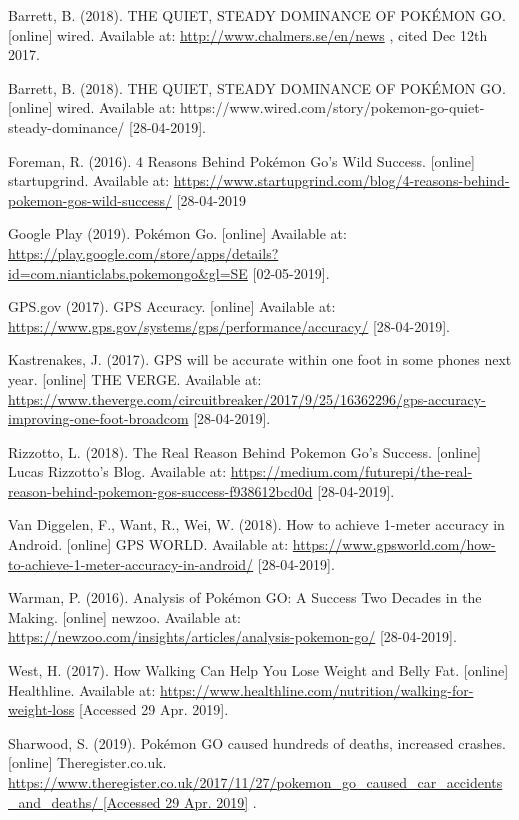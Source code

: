 \documentclass[12pt,a4paper,twoside]{report}
\begin{document}
\newpage
\begin{thebibliography}{widestlabel}

Barrett, B. (2018). THE QUIET, STEADY DOMINANCE OF POKÉMON GO. [online] wired. Available at: \url{http://www.chalmers.se/en/news} , cited Dec 12th 2017.

Barrett, B. (2018). THE QUIET, STEADY DOMINANCE OF POKÉMON GO. [online] wired. Available at: https://www.wired.com/story/pokemon-go-quiet-steady-dominance/ [28-04-2019].

Foreman, R. (2016). 4 Reasons Behind Pokémon Go’s Wild Success. [online] startupgrind. Available at: \url{https://www.startupgrind.com/blog/4-reasons-behind-pokemon-gos-wild-success/} [28-04-2019

Google Play (2019). Pokémon Go. [online] Available at: \url{https://play.google.com/store/apps/details?id=com.nianticlabs.pokemongo&gl=SE} [02-05-2019].

GPS.gov (2017). GPS Accuracy. [online] Available at: \url{https://www.gps.gov/systems/gps/performance/accuracy/} [28-04-2019].

Kastrenakes, J. (2017). GPS will be accurate within one foot in some phones next year. [online] THE VERGE. Available at: \url{https://www.theverge.com/circuitbreaker/2017/9/25/16362296/gps-accuracy-improving-one-foot-broadcom} [28-04-2019].

Rizzotto, L. (2018). The Real Reason Behind Pokemon Go’s Success. [online] Lucas Rizzotto’s Blog. Available at: \url{https://medium.com/futurepi/the-real-reason-behind-pokemon-gos-success-f938612bcd0d} [28-04-2019].

Van Diggelen, F., Want, R., Wei, W. (2018). How to achieve 1-meter accuracy in Android. [online] GPS WORLD. Available at: \url{https://www.gpsworld.com/how-to-achieve-1-meter-accuracy-in-android/} [28-04-2019].

Warman, P. (2016). Analysis of Pokémon GO: A Success Two Decades in the Making. [online] newzoo. Available at: \url{https://newzoo.com/insights/articles/analysis-pokemon-go/} [28-04-2019].

West, H. (2017). How Walking Can Help You Lose Weight and Belly Fat. [online] Healthline. Available at: \url{https://www.healthline.com/nutrition/walking-for-weight-loss} [Accessed 29 Apr. 2019].

Sharwood, S. (2019). Pokémon GO caused hundreds of deaths, increased crashes. [online] Theregister.co.uk. \url{https://www.theregister.co.uk/2017/11/27/pokemon_go_caused_car_accidents_and_deaths/ [Accessed 29 Apr. 2019]} .


\end{thebibliography}
\end{document}
